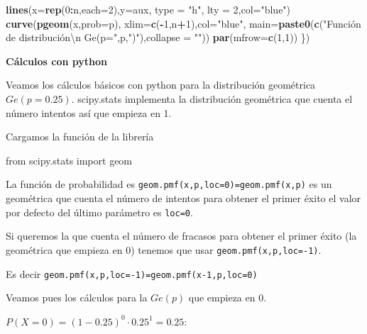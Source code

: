 \documentclass[]{book}
\newenvironment{Shaded}{\begin{snugshade}}{\end{snugshade}}
\newcommand{\DataTypeTok}[1]{\textcolor[rgb]{0.13,0.29,0.53}{#1}}
\newcommand{\DecValTok}[1]{\textcolor[rgb]{0.00,0.00,0.81}{#1}}
\newcommand{\ImportTok}[1]{#1}
\newcommand{\KeywordTok}[1]{\textcolor[rgb]{0.13,0.29,0.53}{\textbf{#1}}}
\newcommand{\NormalTok}[1]{#1}
\newcommand{\OperatorTok}[1]{\textcolor[rgb]{0.81,0.36,0.00}{\textbf{#1}}}
\newcommand{\StringTok}[1]{\textcolor[rgb]{0.31,0.60,0.02}{#1}}
\begin{document}
\begin{Shaded}
\begin{Highlighting}[]
  \KeywordTok{lines}\NormalTok{(}\DataTypeTok{x=}\KeywordTok{rep}\NormalTok{(}\DecValTok{0}\OperatorTok{:}\NormalTok{n,}\DataTypeTok{each=}\DecValTok{2}\NormalTok{),}\DataTypeTok{y=}\NormalTok{aux, }\DataTypeTok{type =} \StringTok{"h"}\NormalTok{, }\DataTypeTok{lty =} \DecValTok{2}\NormalTok{,}\DataTypeTok{col=}\StringTok{"blue"}\NormalTok{)}
  \KeywordTok{curve}\NormalTok{(}\KeywordTok{pgeom}\NormalTok{(x,}\DataTypeTok{prob=}\NormalTok{p),}
        \DataTypeTok{xlim=}\KeywordTok{c}\NormalTok{(}\OperatorTok{-}\DecValTok{1}\NormalTok{,n}\OperatorTok{+}\DecValTok{1}\NormalTok{),}\DataTypeTok{col=}\StringTok{"blue"}\NormalTok{,}
        \DataTypeTok{main=}\KeywordTok{paste0}\NormalTok{(}\KeywordTok{c}\NormalTok{(}\StringTok{"Función de distribución\textbackslash{}n Ge(p="}\NormalTok{,p,}\StringTok{")"}\NormalTok{),}\DataTypeTok{collapse =} \StringTok{""}\NormalTok{))}
  \KeywordTok{par}\NormalTok{(}\DataTypeTok{mfrow=}\KeywordTok{c}\NormalTok{(}\DecValTok{1}\NormalTok{,}\DecValTok{1}\NormalTok{))}
\NormalTok{\})}
\end{Highlighting}
\end{Shaded}

\textbf{Cálculos con python}

Veamos los cálculos básicos con python para la distribución geométrica \(Ge(p=0.25)\). scipy.stats implementa la distribución geométrica que cuenta el número intentos así que empieza en 1.

Cargamos la función de la librería

\begin{Shaded}
\begin{Highlighting}[]
\ImportTok{from}\NormalTok{ scipy.stats }\ImportTok{import}\NormalTok{ geom}
\end{Highlighting}
\end{Shaded}

La función de probabilidad es \texttt{geom.pmf(x,p,loc=0)=geom.pmf(x,p)} es un geométrica que cuenta el número de intentos para obtener el primer éxito el valor por defecto del último parámetro es \texttt{loc=0}.

Si queremos la que cuenta el número de fracasos para obtener el primer éxito (la geométrica que empieza en 0) tenemos que usar \texttt{geom.pmf(x,p,loc=-1)}.

Es decir \texttt{geom.pmf(x,p,loc=-1)=geom.pmf(x-1,p,loc=0)}

Veamos pues los cálculos para la \(Ge(p)\) que empieza en \(0\).

\(P(X=0)=(1-0.25)^0\cdot 0.25^1=0.25\):
\end{document}
